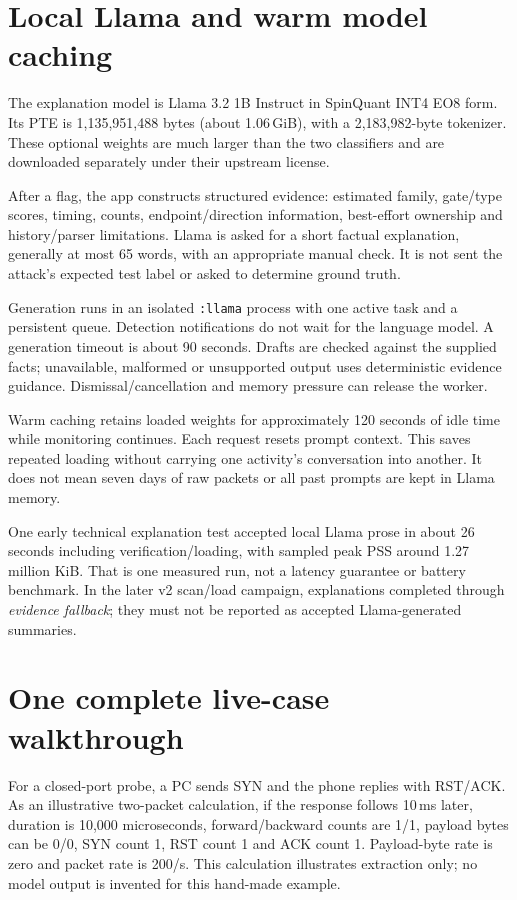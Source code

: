 \documentclass[11pt,a4paper,oneside]{report}
\newcommand{\code}[1]{\nolinkurl{#1}}
\begin{document}
\section{Local Llama and warm model caching}
The explanation model is Llama 3.2 1B Instruct in SpinQuant INT4 EO8 form. Its PTE is 1,135,951,488 bytes (about 1.06\,GiB), with a 2,183,982-byte tokenizer. These optional weights are much larger than the two classifiers and are downloaded separately under their upstream license.

After a flag, the app constructs structured evidence: estimated family, gate/type scores, timing, counts, endpoint/direction information, best-effort ownership and history/parser limitations. Llama is asked for a short factual explanation, generally at most 65 words, with an appropriate manual check. It is not sent the attack's expected test label or asked to determine ground truth.

Generation runs in an isolated \code{:llama} process with one active task and a persistent queue. Detection notifications do not wait for the language model. A generation timeout is about 90 seconds. Drafts are checked against the supplied facts; unavailable, malformed or unsupported output uses deterministic evidence guidance. Dismissal/cancellation and memory pressure can release the worker.

Warm caching retains loaded weights for approximately 120 seconds of idle time while monitoring continues. Each request resets prompt context. This saves repeated loading without carrying one activity's conversation into another. It does not mean seven days of raw packets or all past prompts are kept in Llama memory.

One early technical explanation test accepted local Llama prose in about 26 seconds including verification/loading, with sampled peak PSS around 1.27 million KiB. That is one measured run, not a latency guarantee or battery benchmark. In the later v2 scan/load campaign, explanations completed through \emph{evidence fallback}; they must not be reported as accepted Llama-generated summaries.

\section{One complete live-case walkthrough}
For a closed-port probe, a PC sends SYN and the phone replies with RST/ACK. As an illustrative two-packet calculation, if the response follows 10\,ms later, duration is 10,000 microseconds, forward/backward counts are 1/1, payload bytes can be 0/0, SYN count 1, RST count 1 and ACK count 1. Payload-byte rate is zero and packet rate is 200/s. This calculation illustrates extraction only; no model output is invented for this hand-made example.
\end{document}
